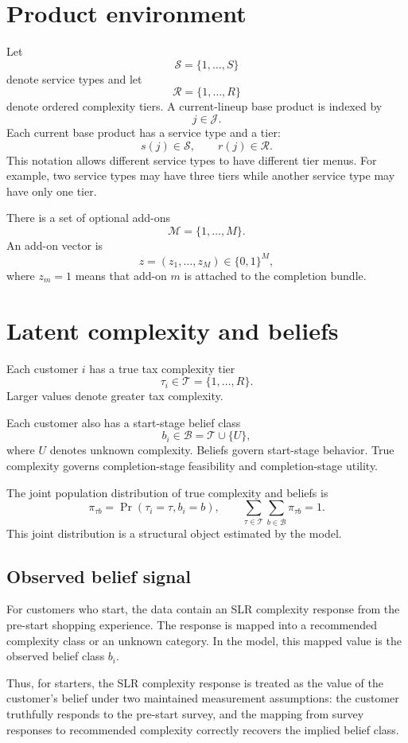 \documentclass[11pt]{article}
\newcommand{\J}{\mathcal{J}}
\newcommand{\Sset}{\mathcal{S}}
\newcommand{\Rset}{\mathcal{R}}
\newcommand{\Tset}{\mathcal{T}}
\newcommand{\Bset}{\mathcal{B}}
\newcommand{\Mset}{\mathcal{M}}
\newcommand{\Prb}{\Pr}
\begin{document}
\newpage

\section{Product environment}


Let
\[
\Sset=\{1,\ldots,S\}
\]
denote service types and let
\[
\Rset=\{1,\ldots,R\}
\]
denote ordered complexity tiers. A current-lineup base product is indexed by
\[
j\in\J.
\]
Each current base product has a service type and a tier:
\[
s(j)\in\Sset,
\qquad
r(j)\in\Rset.
\]
This notation allows different service types to have different tier menus. For example, two service types may have three tiers while another service type may have only one tier.

There is a set of optional add-ons
\[
\Mset=\{1,\ldots,M\}.
\]
An add-on vector is
\[
z=(z_1,\ldots,z_M)\in\{0,1\}^M,
\]
where $z_m=1$ means that add-on $m$ is attached to the completion bundle.

\section{Latent complexity and beliefs}

Each customer $i$ has a true tax complexity tier
\[
\tau_i\in\Tset=\{1,\ldots,R\}.
\]
Larger values denote greater tax complexity.

Each customer also has a start-stage belief class
\[
b_i\in\Bset=\Tset\cup\{U\},
\]
where $U$ denotes unknown complexity. Beliefs govern start-stage behavior. True complexity governs completion-stage feasibility and completion-stage utility.

The joint population distribution of true complexity and beliefs is
\[
\pi_{\tau b}=\Prb(\tau_i=\tau,b_i=b),
\qquad
\sum_{\tau\in\Tset}\sum_{b\in\Bset}\pi_{\tau b}=1.
\]
This joint distribution is a structural object estimated by the model.

\subsection*{Observed belief signal}

For customers who start, the data contain an SLR complexity response from the pre-start shopping experience. The response is mapped into a recommended complexity class or an unknown category. In the model, this mapped value is the observed belief class $b_i$.

Thus, for starters, the SLR complexity response is treated as the value of the customer's belief under two maintained measurement assumptions: the customer truthfully responds to the pre-start survey, and the mapping from survey responses to recommended complexity correctly recovers the implied belief class.
\end{document}
